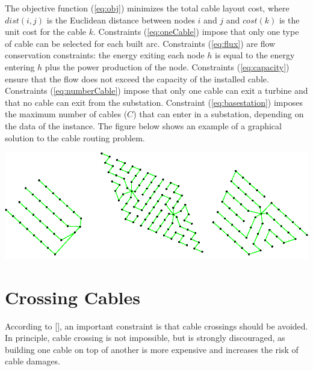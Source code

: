 The objective function (\ref{eq:obj}) minimizes the total cable layout cost, where $dist(i, j)$ is the Euclidean distance between nodes $i$ and $j$ and $cost(k)$ is the unit cost for the cable $k$. 
Constraints (\ref{eq:oneCable}) impose that only one type of cable can be selected for each built arc.
Constraints (\ref{eq:flux}) are flow conservation constraints: the energy exiting each node $h$ is equal to the energy entering $h$ plus the power production of the node. 
Constraints (\ref{eq:capacity}) ensure that the flow does not exceed the capacity of the installed cable.
Constraints (\ref{eq:numberCable}) impose that only one cable can exit a turbine and that no cable can exit from the substation. 
Constraint (\ref{eq:basestation}) imposes the maximum number of cables ($C$) that can enter in a substation, depending on the data of the instance. The figure below shows an example of a graphical solution to the cable routing problem.

\begin{center}
	\includegraphics[scale=0.3]{Graphics/wfcp.png}
	\label{img:wfcp}
\end{center}
	
\section{Crossing Cables}
According to [\cite{wfcp}], an important constraint is that cable crossings should be avoided. In principle, cable crossing is not impossible, but is strongly discouraged, as building one cable on top of another is more expensive and increases the risk of cable damages.\\

